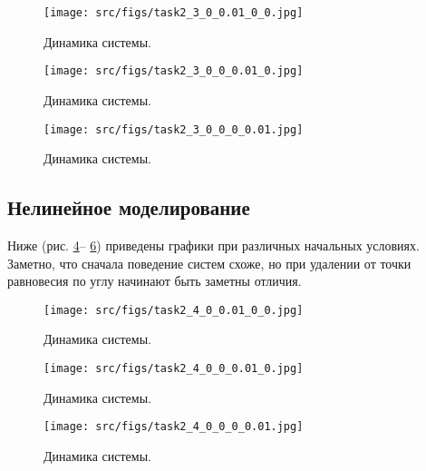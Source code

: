 \begin{figure}[ht!]
  \centering
  \texttt{[image: src/figs/task2\_3\_0\_0.01\_0\_0.jpg]}
  \caption{Динамика системы.}
  \label{fig:task2_3_0_0.01_0_0.1}
\end{figure}

\begin{figure}[ht!]
  \centering
  \texttt{[image: src/figs/task2\_3\_0\_0\_0.01\_0.jpg]}
  \caption{Динамика системы.}
  \label{fig:task2_3_0_0_0.01_0}
\end{figure}
\begin{figure}[ht!]
  \centering
  \texttt{[image: src/figs/task2\_3\_0\_0\_0\_0.01.jpg]}
  \caption{Динамика системы.}
  \label{fig:task2_3_0_0_0_0.01}
\end{figure}
\FloatBarrier

\subsection{Нелинейное моделирование}
Ниже (рис. \ref{fig:task2_4_0_0.01_0_0.1}-- \ref{fig:task2_4_0_0_0_0.01}) приведены графики при различных начальных условиях. Заметно, что сначала поведение систем схоже, но при удалении от точки равновесия по углу начинают быть заметны отличия.
\begin{figure}[ht!]
  \centering
  \texttt{[image: src/figs/task2\_4\_0\_0.01\_0\_0.jpg]}
  \caption{Динамика системы.}
  \label{fig:task2_4_0_0.01_0_0.1}
\end{figure}

\begin{figure}[ht!]
  \centering
  \texttt{[image: src/figs/task2\_4\_0\_0\_0.01\_0.jpg]}
  \caption{Динамика системы.}
  \label{fig:task2_4_0_0_0.01_0}
\end{figure}
\begin{figure}[ht!]
  \centering
  \texttt{[image: src/figs/task2\_4\_0\_0\_0\_0.01.jpg]}
  \caption{Динамика системы.}
  \label{fig:task2_4_0_0_0_0.01}
\end{figure}
\FloatBarrier